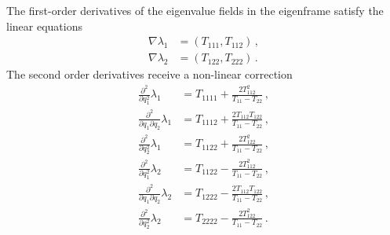 \documentclass[a4paper, 11pt]{article}
\begin{document}
The first-order derivatives of the eigenvalue fields in the eigenframe satisfy the linear equations
\begin{align}
\nabla \lambda_1&= (T_{111}, T_{112})\,,\\
\nabla \lambda_2&= (T_{122}, T_{222})\,.
\end{align}
The second order derivatives receive a non-linear correction
\begin{align}
\frac{\partial^2}{\partial q_1^2} \lambda_1&= T_{1111} + \frac{2 T_{112}^2}{T_{11}-T_{22}}\,,\\
\frac{\partial^2}{\partial q_1 \partial q_2} \lambda_1&= T_{1112} + \frac{2 T_{112}T_{122}}{T_{11}-T_{22}}\,,\\
\frac{\partial^2}{\partial q_2^2} \lambda_1&= T_{1122} + \frac{2T_{122}^2}{T_{11}-T_{22}}\,,\\
\frac{\partial^2}{\partial q_1^2} \lambda_2&= T_{1122} - \frac{2 T_{112}^2}{T_{11}-T_{22}}\,,\\
\frac{\partial^2}{\partial q_1 \partial q_2} \lambda_2&= T_{1222} - \frac{2 T_{112}T_{122}}{T_{11}-T_{22}}\,,\\
\frac{\partial^2}{\partial q_2^2} \lambda_2&= T_{2222} - \frac{2T_{122}^2}{T_{11}-T_{22}}\,.
\end{align}
\end{document}
